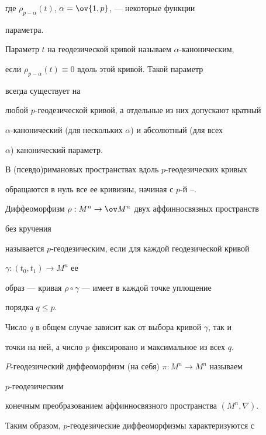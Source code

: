 где $\rho_{p-\alpha}(t)$, $\alpha=\ov{1,p}$, --- некоторые функции


параметра.





Параметр $t$ на геодезической кривой называем $\alpha$-каноническим,


если $\rho_{p-\alpha}(t)\equiv 0$ вдоль этой кривой. Такой параметр


всегда существует на


любой $p$-геодезической кривой, а отдельные из них допускают кратный


$\alpha$-канонический (для нескольких $\alpha$) и абсолютный (для всех


$\alpha$) канонический параметр.





В (псевдо)римановых пространствах вдоль $p$-геодезических кривых


обращаются в нуль все ее кривизны, начиная с $p$-й \cite{2}--\cite{4}.





\begin{defn}


Диффеоморфизм $\rho:M^n\to\ov M{}^n$ двух аффинносвязных пространств


без кручения


называется $p$-геодезическим, если для каждой геодезической кривой


$\gamma:(t_0,t_1)\to M^n$ ее


образ --- кривая $\rho\circ\gamma$ --- имеет в каждой точке уплощение


порядка $q\le p$.


Число $q$ в общем случае зависит как от выбора кривой $\gamma$, так и


точки на ней, а число $p$ фиксировано и максимальное из всех $q$.\;


$P$-геодезический диффеоморфизм (на себя) $\pi:M^n\to M^n$ называем


$p$-геодезическим


конечным преобразованием аффинносвязного пространства $(M^n,\nabla)$.


\end{defn}





Таким образом, $p$-геодезические диффеоморфизмы характеризуются с


